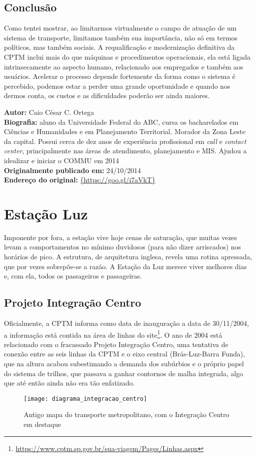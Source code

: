 \documentclass[11pt,fleqn]{book} %
\newcommand{\infocaio}[2]{\textbf{Autor:} Caio C\'{e}sar C. Ortega \\ \textbf{Biografia:} aluno da Universidade Federal do ABC, cursa os bacharelados em Ci\^{e}ncias e Humanidades e em Planejamento Territorial. Morador da Zona Leste da capital. Possui cerca de dez anos de experi\^{e}ncia profissional em \textit{call} e \textit{contact center}, principalmente nas \'{a}reas de atendimento, planejamento e MIS. Ajudou a idealizar e iniciar o COMMU em 2014 \\ \textbf{Originalmente publicado em:} {#1} \\ \textbf{Endere\c{c}o do original:} \url{{#2}}}
\begin{document}
\subsection{Conclusão}

Como tentei mostrar, ao limitarmos virtualmente o campo de atuação de um sistema de transporte, limitamos também sua importância, não só em termos políticos, mas também sociais. A requalificação e modernização definitiva da CPTM inclui mais do que máquinas e procedimentos operacionais, ela está ligada intrinsecamente ao aspecto humano, relacionado aos empregados e também aos usuários. Acelerar o processo depende fortemente da forma como o sistema é percebido, podemos estar a perder uma grande oportunidade e quando nos dermos conta, os custos e as dificuldades poderão ser ainda maiores.

\begin{info}
	\infocaio{24/10/2014}{https://goo.gl/i7aVkT}
\end{info}

\section{Estação Luz}

Imponente por fora, a estação vive hoje cenas de saturação, que muitas vezes levam a comportamentos no mínimo duvidosos (para não dizer arriscados) nos horários de pico. A estrutura, de arquitetura inglesa, revela uma rotina apressada, que por vezes sobrepõe-se a razão. A Estação da Luz merece viver melhores dias e, com ela, todos os passageiros e passageiras.

\subsection{Projeto Integração Centro}\label{ss:icentro}

Oficialmente, a CPTM informa como data de inauguração a data de 30/11/2004, a informação está contida na área de linhas do site\footnote{\url{https://www.cptm.sp.gov.br/sua-viagem/Pages/Linhas.aspx}}. O ano de 2004 está relacionado com o fracassado Projeto Integração Centro, uma tentativa de conexão entre as seis linhas da CPTM e o eixo central (Brás-Luz-Barra Funda), que na altura acabou subestimando a demanda dos subúrbios e o próprio papel do sistema de trilhos, que passava a ganhar contornos de malha integrada, algo que até então ainda não era tão enfatizado.

\begin{figure}[htb]
	\centering
	\texttt{[image: diagrama\_integracao\_centro]}
	\caption[Mapa do Integração Centro]{Antigo mapa do transporte metropolitano, com o Integração Centro em destaque}
	\label{fig:diag_ic}
\end{figure}
\end{document}
